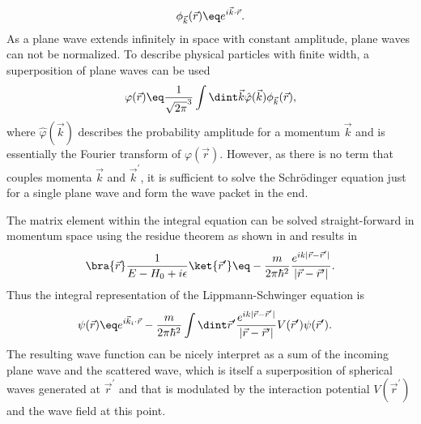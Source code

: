\documentclass[\main/dresen_thesis.tex]{subfiles}
\begin{document}
    \begin{align}
      \phi_{\vec{k}}(\vec{r}) \eq e^{i\vec{k} \cdot \vec{r}}.
    \end{align}
    As a plane wave extends infinitely in space with constant amplitude, plane waves can not be normalized.
    To describe physical particles with finite width, a superposition of plane waves can be used
    \begin{align}
      \varphi(\vec{r}) \eq \frac{1}{\sqrt{2 \pi}^3} \int \dint \vec{k} \hat{\varphi} (\vec{k}) \phi_{\vec{k}}(\vec{r}),
    \end{align}
    where $\hat{\varphi} (\vec{k})$ describes the probability amplitude for a momentum $\vec{k}$ and is essentially the Fourier transform of $\varphi(\vec{r})$.
    However, as there is no term that couples momenta $\vec{k}$ and $\vec{k}^\prime$, it is sufficient to solve the Schr\"odinger equation just for a single plane wave and form the wave packet in the end.

    The matrix element within the integral equation  can be solved straight-forward in momentum space using the residue theorem as shown in  and results in
    \begin{align}
      \bra{\vec{r}}\frac{1}{E - H_0 + i \epsilon} \ket{\vec{r}^\prime} \eq -\frac{m}{2 \pi \hbar^2} \frac{e^{ik|\vec{r} - \vec{r}^\prime|}}{|\vec{r} - \vec{r}^\prime|}.
    \end{align}
    Thus the integral representation of the Lippmann-Schwinger equation is
    \begin{align}
      \psi (\vec{r}) &\eq e^{i\vec{k}_i \cdot \vec{r}} - \frac{m}{2 \pi\hbar^2} \int \dint \vec{r}^\prime \frac{e^{ik|\vec{r} - \vec{r}^\prime|}}{|\vec{r} - \vec{r}^\prime|} V (\vec{r}^\prime)\psi (\vec{r}^\prime).
    \end{align}
    The resulting wave function can be nicely interpret as a sum of the incoming plane wave and the scattered wave, which is itself a superposition of spherical waves generated at $\vec{r}^\prime$ and that is modulated by the interaction potential $V(\vec{r}^\prime)$ and the wave field at this point.
\end{document}

